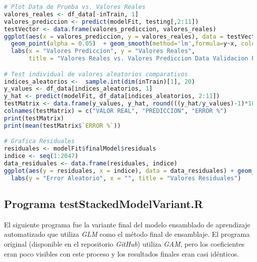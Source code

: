 \begin{lstlisting}[language=R]
# Plot Data de Prueba vs. Valores Reales
valores_reales <- df_data[-inTrain, 1]
valores_prediccion <- predict(modelFit, testing[,2:11])
testVector <- data.frame(valores_prediccion, valores_reales)
ggplot(aes(x = valores_prediccion, y = valores_reales), data = testVector) + 
  geom_point(alpha = 0.05)  + geom_smooth(method='lm',formula=y~x, colour = "yellow") +
  labs(x = "Valores Prediccion", y = "Valores Reales", 
       title = "Valores Reales vs. Valores Prediccion Data Validacion Regresion Multivariable")

# Test individual de valores aleatorios comparativos
indices_aleatorios <-  sample.int(dim(inTrain)[1], 20)
y_values <- df_data[indices_aleatorios, 1]
y_hat <- predict(modelFit, df_data[indices_aleatorios, 2:11])
testMatrix <- data.frame(y_values, y_hat, round(((y_hat/y_values)-1)*100,1))
colnames(testMatrix) = c("VALOR REAL", "PREDICCION", "ERROR %")
print(testMatrix)
print(mean(testMatrix$`ERROR %`))

# Grafica Residuales
residuales <- modelFit$finalModel$residuals
indice <- seq(1:2047)
data_residuales <- data.frame(residuales, indice)
ggplot(aes(y = residuales, x = indice), data = data_residuales) + geom_jitter(alpha = 1/05) +
  labs(y = "Error Aleatorio", x = "", title = "Valores Residuales")
\end{lstlisting}

\subsection{Programa testStackedModelVariant.R}
El siguiente programa fue la variante final del modelo ensamblado de aprendizaje automatizado que utiliza \emph{GLM} como el método final de ensamblaje. El programa original (disponible en el repositorio \emph{GitHub}) utiliza \emph{GAM}, pero los coeficientes eran poco visibles con este proceso y los resultados finales eran casi idénticos.  

